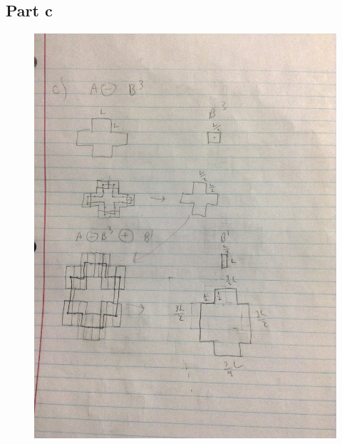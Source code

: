 \documentclass{article}
\begin{document}
	\subsection{Part c}
	\begin{figure}[H]
		\includegraphics[width=\linewidth]{9.6/fig3.JPG}
	\end{figure}
\end{document}
